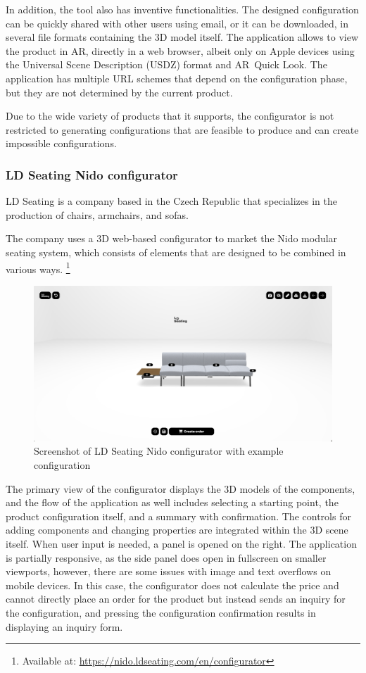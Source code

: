 In addition, the tool also has inventive functionalities. The designed configuration can be quickly shared with other users using email, or it can be downloaded, in several file formats containing the 3D model itself. The application allows to view the product in AR, directly in a web browser, albeit only on Apple devices using the Universal Scene Description (USDZ) format and AR~Quick Look. \cite{Jackson2018}
The application has multiple URL schemes that depend on the configuration phase, but they are not determined by the current product. 

Due to the wide variety of products that it supports, the configurator is not restricted to generating configurations that are feasible to produce and can create impossible configurations.

\subsubsection{LD Seating Nido configurator}

LD Seating is a company based in the Czech Republic that specializes in the production of chairs, armchairs, and sofas. \cite{LDSeating}

The company uses a 3D web-based configurator to market the Nido modular seating system, which consists of elements that are designed to be combined in various ways. \footnote{Available at: \url{https://nido.ldseating.com/en/configurator}}

\begin{figure}[ht]
\centering
\includegraphics[width=14cm]{images/analysis_nido-configurator.png}
\caption{Screenshot of LD Seating Nido configurator with example configuration}
\end{figure}

The primary view of the configurator displays the 3D models of the components, and the flow of the application as well includes selecting a starting point, the product configuration itself, and a summary with confirmation. The controls for adding components and changing properties are integrated within the 3D scene itself. When user input is needed, a panel is opened on the right. The application is partially responsive, as the side panel does open in fullscreen on smaller viewports, however, there are some issues with image and text overflows on mobile devices. In this case, the configurator does not calculate the price and cannot directly place an order for the product but instead sends an inquiry for the configuration, and pressing the configuration confirmation results in displaying an inquiry form.

